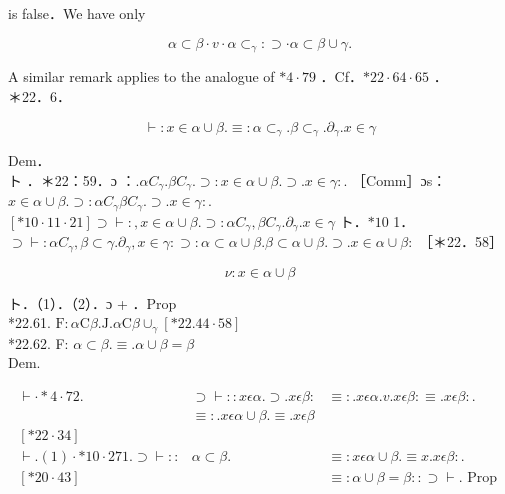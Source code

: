 \documentclass[10pt]{article}
\begin{document}
is false．We have only

$$
\alpha \subset \beta \cdot v \cdot \alpha \subset_{\gamma}: \supset \cdot \alpha \subset \beta \cup \gamma .
$$

A similar remark applies to the analogue of $* 4 \cdot 79$ ．Cf．$* 22 \cdot 64 \cdot 65$ ．\\
＊22．6．

$$
\vdash: x \in \alpha \cup \beta . \equiv: \alpha \subset_{\gamma} . \beta \subset_{\gamma} . \partial_{\gamma} . x \in \gamma
$$

Dem．\\
ト ．＊22：59．ɔ ：$. \alpha C_{\gamma} . \beta C_{\gamma} . \supset: x \in \alpha \cup \beta . \supset . x \in \gamma:$. ［Comm］ɔs：$x \in \alpha \cup \beta . \supset: \alpha C_{\gamma} \beta C_{\gamma} . \supset . x \in \gamma:$. $[* 10 \cdot 11 \cdot 21] \supset \vdash:, x \in \alpha \cup \beta . \supset: \alpha C_{\gamma}, \beta C_{\gamma} . \partial_{\gamma} . x \in \gamma$ ト．$* 10$ 1．$\supset \vdash: \alpha C_{\gamma}, \beta \subset \gamma . \partial_{\gamma}, x \in \gamma: \supset: \alpha \subset \alpha \cup \beta . \beta \subset \alpha \cup \beta . \supset . x \in \alpha \cup \beta:$ ［＊22．58］


\begin{equation*}
\nu: x \in \alpha \cup \beta \tag{1}
\end{equation*}


ト．（1）．（2）．ɔ + ．Prop\\
*22.61. $\mathrm{F}: \alpha \mathrm{C} \beta . \mathrm{J} . \alpha \mathrm{C} \beta \cup_{\gamma}[* 22.44 \cdot 58]$\\
*22.62. F: $\alpha \subset \beta . \equiv . \alpha \cup \beta=\beta$\\
Dem.

\[
\begin{array}{rlrl}
\vdash \cdot * 4 \cdot 72 . & \supset \vdash:: x \epsilon \alpha . \supset . x \epsilon \beta: & \equiv: . x \epsilon \alpha . v . x \epsilon \beta: \equiv . x \epsilon \beta: . \\
& \equiv: . x \epsilon \alpha \cup \beta . \equiv . x \epsilon \beta  \tag{1}\\
{[* 22 \cdot 34]} & \\
\vdash .(1) \cdot * 10 \cdot 271 . \supset \vdash:: & \alpha \subset \beta . & \equiv: x \epsilon \alpha \cup \beta . \equiv x . x \epsilon \beta: . \\
{[* 20 \cdot 43]} & & \equiv: \alpha \cup \beta=\beta:: \supset \vdash . \text { Prop }
\end{array}
\]
\end{document}
